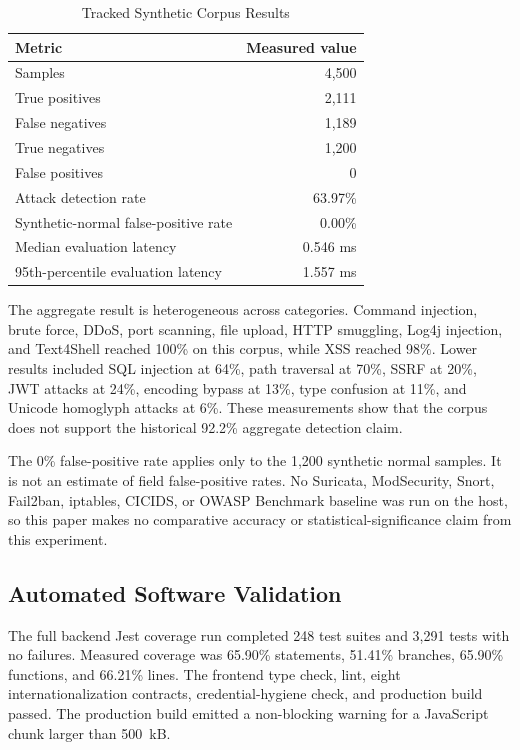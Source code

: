 \begin{table}[htbp]
\centering
\caption{Tracked Synthetic Corpus Results}
\label{tab:synthetic-corpus-results}
\begin{tabular}{|l|r|}
\hline
\textbf{Metric} & \textbf{Measured value} \\
\hline
Samples & 4,500 \\
True positives & 2,111 \\
False negatives & 1,189 \\
True negatives & 1,200 \\
False positives & 0 \\
Attack detection rate & 63.97\% \\
Synthetic-normal false-positive rate & 0.00\% \\
Median evaluation latency & 0.546 ms \\
95th-percentile evaluation latency & 1.557 ms \\
\hline
\end{tabular}
\end{table}

The aggregate result is heterogeneous across categories. Command injection, brute force, DDoS, port scanning, file upload, HTTP smuggling, Log4j injection, and Text4Shell reached 100\% on this corpus, while XSS reached 98\%. Lower results included SQL injection at 64\%, path traversal at 70\%, SSRF at 20\%, JWT attacks at 24\%, encoding bypass at 13\%, type confusion at 11\%, and Unicode homoglyph attacks at 6\%. These measurements show that the corpus does not support the historical 92.2\% aggregate detection claim.

The 0\% false-positive rate applies only to the 1,200 synthetic normal samples. It is not an estimate of field false-positive rates. No Suricata, ModSecurity, Snort, Fail2ban, iptables, CICIDS, or OWASP Benchmark baseline was run on the host, so this paper makes no comparative accuracy or statistical-significance claim from this experiment.

\subsection{Automated Software Validation}
\label{subsec:automated-validation}

The full backend Jest coverage run completed 248 test suites and 3,291 tests with no failures. Measured coverage was 65.90\% statements, 51.41\% branches, 65.90\% functions, and 66.21\% lines. The frontend type check, lint, eight internationalization contracts, credential-hygiene check, and production build passed. The production build emitted a non-blocking warning for a JavaScript chunk larger than 500~kB.

